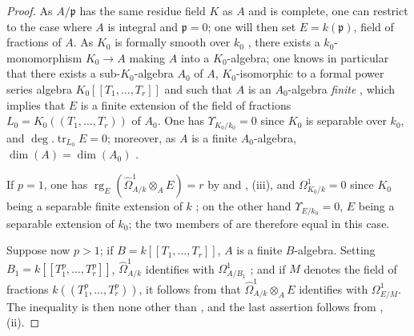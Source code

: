 \begin{proof}
As $A/\mathfrak{p}$ has the same residue field $K$ as $A$ and is complete, one can restrict to the case where $A$ is integral and $\mathfrak{p}=0$; one will then set $E=k(\mathfrak{p})$, field of fractions of $A$.
As $K_0$ is formally smooth over $k_0$ , there exists a $k_0$-monomorphism $K_0\to A$ making $A$ into a $K_0$-algebra; one knows in particular that there exists a sub-$K_0$-algebra $A_0$ of $A$, $K_0$-isomorphic to a formal power series algebra $K_0[[T_1,\ldots,T_r]]$ and such that $A$ is an $A_0$-algebra \emph{finite} , which implies that $E$ is a finite extension of the field of fractions $L_0=K_0((T_1,\ldots,T_r))$ of $A_0$.
One has $\Upsilon_{K_0/k_0}=0$ since $K_0$ is separable over $k_0$, and $\deg.\operatorname{tr}_{L_0}E=0$; moreover, as $A$ is a finite $A_0$-algebra, $\dim(A)=\dim(A_0)$ .

If $p=1$, one has $\operatorname{rg}_E(\widehat{\Omega}^1_{A/k}\otimes_A E)=r$ by  and , (iii), and $\Omega^1_{K_0/k}=0$ since $K_0$ being a separable finite extension of $k$ ; on the other hand $\Upsilon_{E/k_0}=0$, $E$ being a separable extension of $k_0$; the two members of  are therefore equal in this case.

Suppose now $p>1$; if $B=k[[T_1,\ldots,T_r]]$, $A$ is a finite $B$-algebra. Setting $B_1=k[[T_1^p,\ldots,T_r^p]]$, $\widehat{\Omega}^1_{A/k}$ identifies with $\Omega^1_{A/B_1}$ ; and if $M$ denotes the field of fractions $k((T_1^p,\ldots,T_r^p))$, it follows from  that $\widehat{\Omega}^1_{A/k}\otimes_A E$ identifies with $\Omega^1_{E/M}$. The inequality  is then none other than , and the last assertion follows from , (ii).
\end{proof}
